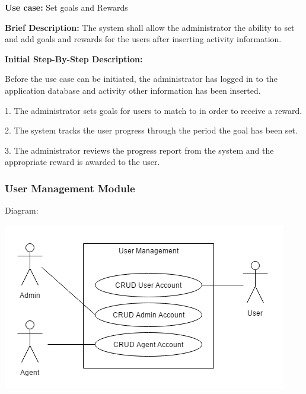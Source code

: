 \documentclass{article}
\begin{document}
\begin{flushleft}
    \textbf{Use case:} Set goals and Rewards  
    \newline
    	
    \textbf{Brief Description:}
    \newline
    The system shall allow the administrator the ability to set and add goals and rewards for the users after inserting activity information. 
    \newline
    
    \textbf{Initial Step-By-Step Description:}
    
    Before the use case can be initiated, the administrator has logged in to the application database and activity other information has been inserted.
	\newline    

1. The administrator sets goals for users to match to in order to receive a reward.

2. The system tracks the user progress through the period the goal has been set.

3. The administrator reviews the progress report from the system and the appropriate reward is awarded to the user.


\end{flushleft}

\subsubsection{User Management Module}
    Diagram:
    
    \includegraphics[scale=.7]{UserManagement} 
    
\end{document}
